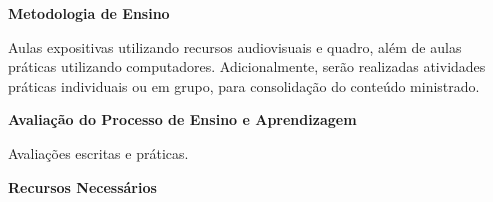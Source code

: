 








\begin{snugshade}\begin{center}\textbf{
    Metodologia de Ensino
}\end{center}\end{snugshade} 

\noindent
   Aulas expositivas utilizando recursos audiovisuais e quadro, além de aulas práticas utilizando computadores. Adicionalmente, serão realizadas atividades práticas individuais ou em grupo, para consolidação do conteúdo ministrado.

\begin{snugshade}\begin{center}\textbf{
    Avaliação do Processo de Ensino e Aprendizagem
}\end{center}\end{snugshade}   

\noindent
   Avaliações escritas e práticas.

\begin{snugshade}\begin{center}\textbf{
    Recursos Necessários
    \vphantom{q} %
}\end{center}\end{snugshade}

